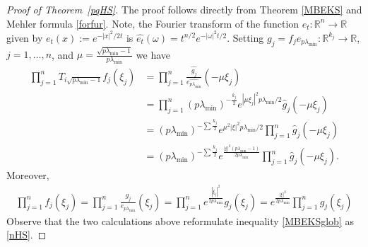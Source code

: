 \documentclass[9pt, a4paper]{amsart}
\newcommand{\R}{\mathbb{R}}
\newcommand{\1}{{\chi_{}}}%
\numberwithin{equation}{section}
\begin{document}
\begin{proof}[Proof of Theorem~\ref{pqHS}]
	The proof follows directly from Theorem \ref{MBEKS} and Mehler formula \eqref{forfur}. Note, the Fourier transform of the function $e_t:\R^n\to\R$ given by $ e_{t}(x) := e^{-|x|^{2}/2t}$ is $ \widehat{e_{t}}(\omega) = t^{n/2}e^{-|\omega|^{2}t/2}$. Setting $g_j=f_je_{p\lambda_{\min}}:\R^{k_j}\to\R$, $j=1,\ldots,n$, and $\mu=\frac{\sqrt{p\lambda_{\min}-1}}{p\lambda_{\min}}$ we have 
	\begin{align*}
		\prod_{j=1}^nT_{i\sqrt{p\lambda_{\min}-1}}f_j(\xi_j)&=\prod_{j=1}^n\frac{\widehat{g_j}}{\widehat{e_{p\lambda_{\min}}}}\left(-\mu \xi_j\right)\\
		&=\prod_{j=1}^n (p\lambda_{\min})^{-\frac{k_j}{2}}e^{|\mu \xi_j|^{2}p\lambda_{\min}/2}\widehat{g}_j(-\mu \xi_j)\\
		&=(p\lambda_{\min})^{-\sum \frac{k_j}{2}}e^{\mu^2|\xi|^{2}p\lambda_{\min}/2}\prod_{j=1}^n \widehat{g}_j(-\mu \xi_j)\\
		&=(p\lambda_{\min})^{-\sum \frac{k_j}{2}}e^{\frac{|\xi|^{2}(p \lambda_{\min}-1)}{2p \lambda_{\min}}}\prod_{j=1}^n \widehat{g}_j(-\mu \xi_j).
	\end{align*}
	Moreover, 
	\begin{align*}
		\prod_{j=1}^nf_j(\xi_j)=\prod_{j=1}^n\frac{g_j}{e_{p\lambda_{\min}}}(\xi_j)=\prod_{j=1}^n e^{\frac{|\xi_j|^{2}}{2p\lambda_{\min}}}g_j(\xi_j)=e^{\frac{|\xi|^{2}}{2p \lambda_{\min}}} \prod_{j=1}^{n} g_{j}(\xi_j)
	\end{align*}
Observe that the two calculations above reformulate inequality \eqref{MBEKSglob} as \eqref{nHS}.
\end{proof}
\end{document}
